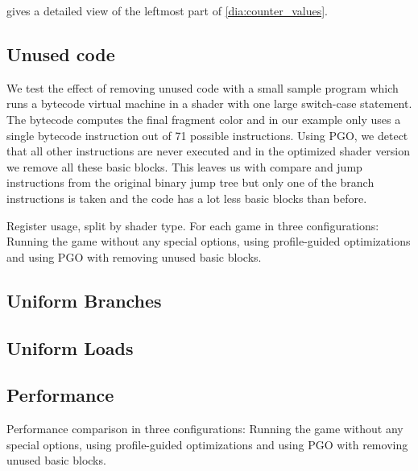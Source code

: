  gives a detailed view of the leftmost part of \cref{dia:counter_values}.




\subsection{Unused code}
\label{sub:eval_unused}
We test the effect of removing unused code with a small sample program which runs a bytecode virtual machine in a shader with one large switch-case statement.
The bytecode computes the final fragment color and in our example only uses a single bytecode instruction out of 71 possible instructions.
Using PGO, we detect that all other instructions are never executed and in the optimized shader version we remove all these basic blocks.
This leaves us with compare and jump instructions from the original binary jump tree but only one of the branch instructions is taken and the code has a lot less basic blocks than before.




Register usage, split by shader type.
For each game in three configurations: Running the game without any special options, using profile-guided optimizations and using PGO with removing unused basic blocks.





\subsection{Uniform Branches}
\label{sub:eval_uniform_branches}



\subsection{Uniform Loads}
\label{sub:eval_uniform_loads}



\subsection{Performance}
\label{sub:eval_perf}
Performance comparison in three configurations: Running the game without any special options, using profile-guided optimizations and using PGO with removing unused basic blocks.

